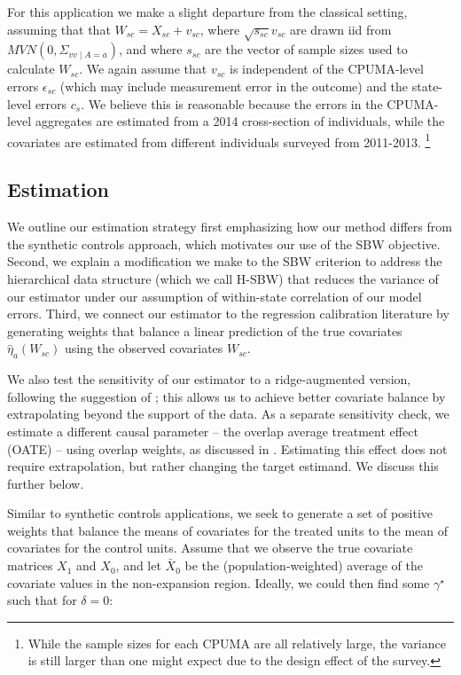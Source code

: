 \documentclass{article}
\begin{document}
For this application we make a slight departure from the classical setting, assuming that that $W_{sc} = X_{sc} + v_{sc}$, where $\sqrt{s_{sc}}v_{sc}$ are drawn iid from $MVN(0, \Sigma_{vv \mid A = a})$, and where $s_{sc}$ are the vector of sample sizes used to calculate $W_{sc}$. We again assume that $v_{sc}$ is independent of the CPUMA-level errors $\epsilon_{sc}$ (which may include measurement error in the outcome) and the state-level errors $c_s$. We believe this is reasonable because the errors in the CPUMA-level aggregates are estimated from a 2014 cross-section of individuals, while the covariates are estimated from different individuals surveyed from 2011-2013. \footnote{While the sample sizes for each CPUMA are all relatively large, the variance is still larger than one might expect due to the design effect of the survey.} 

\subsection{Estimation}

We outline our estimation strategy first emphasizing how our method differs from the synthetic controls approach, which motivates our use of the SBW objective. Second, we explain a modification we make to the SBW criterion to address the hierarchical data structure (which we call H-SBW) that reduces the variance of our estimator under our assumption of within-state correlation of our model errors. Third, we connect our estimator to the regression calibration literature by generating weights that balance a linear prediction of the true covariates $\hat{\eta}_a(W_{sc})$ using the observed covariates $W_{sc}$. 

We also test the sensitivity of our estimator to a ridge-augmented version, following the suggestion of \cite{ben2018augmented}; this allows us to achieve better covariate balance by extrapolating beyond the support of the data. As a separate sensitivity check, we estimate a different causal parameter -- the overlap average treatment effect (OATE) -- using overlap weights, as discussed in \cite{li2018balancing}. Estimating this effect does not require extrapolation, but rather changing the target estimand. We discuss this further below.

Similar to synthetic controls applications, we seek to generate a set of positive weights that balance the means of covariates for the treated units to the mean of covariates for the control units. Assume that we observe the true covariate matrices $X_1$ and $X_0$, and let $\bar{X}_0$ be the (population-weighted) average of the covariate values in the non-expansion region. Ideally, we could then find some $\gamma^\star$ such that for $\delta = 0$: 
\end{document}
